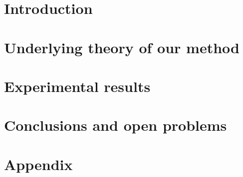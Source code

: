 \documentclass{tfg_domingo}
\begin{document}

\portada
\frontmatter
\gracias{}
\resumen{}{}
\tableofcontents

\mainmatter
\chapter{Introduction}\label{cap:Intro}



\chapter{Underlying theory of our method}\label{cap:Teoria}




\chapter{Experimental results}\label{cap:Resultados}




\chapter{Conclusions and open problems}\label{cap:Conclusiones}






\appendix
\chapter{Appendix}

\end{document}
